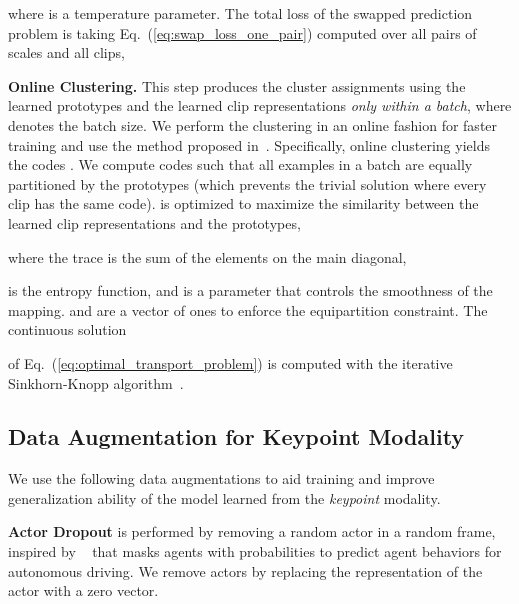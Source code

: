 \documentclass[runningheads]{llncs}
\begin{document}
where  is a temperature parameter.
The total loss of the swapped prediction problem is taking Eq.~(\ref{eq:swap_loss_one_pair}) computed over all pairs of scales
and all  clips, 





 



\noindent \textbf{Online Clustering.} 
This step produces the cluster assignments using the learned prototypes  and the learned clip representations \textit{only within a batch},  where  denotes the batch size.
We perform the clustering in an online fashion for faster training and use the method proposed in~\cite{swav}.
Specifically, online clustering yields the codes . 
We compute codes  
such that all examples in a batch are equally partitioned by the prototypes (which prevents the trivial solution where every clip has the same code).
 is optimized to maximize the similarity between the learned clip representations and the prototypes,


where the trace  is 
the sum of the elements on the main diagonal, 

is the entropy function, and  is a parameter that controls the smoothness of the mapping. 
 and  are a vector of ones to enforce the equipartition constraint.
The continuous solution
 
of Eq.~(\ref{eq:optimal_transport_problem})
is computed with the iterative Sinkhorn-Knopp algorithm~\cite{cuturi2013sinkhorn,swav}.
 


 











\subsection{Data Augmentation for Keypoint Modality}
\label{subsec:data_augmentation}


We use the following data augmentations to aid training and improve generalization ability of the model learned from the \textit{keypoint} modality.

\noindent \textbf{Actor Dropout} is performed by removing a random actor in a random frame, inspired by ~\cite{ngiam2021scene} that masks
agents with probabilities to predict agent behaviors for autonomous driving.
We remove actors 
by replacing the 
representation of the actor with a zero vector.
\end{document}
